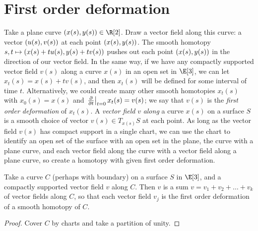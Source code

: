 \section{First order deformation}
Take a plane curve \(\pr{x(s),y(s)}\in\R[2]\).
Draw a vector field along this curve: a vector \(\left(u(s),v(s)\right)\) at each point \(\left(x(s),y(s)\right)\).
The smooth homotopy \(s,t \mapsto \left(x(s)+tu(s),y(s)+tv(s)\right)\) pushes out each point \(\left(x(s),y(s)\right)\) in the direction of our vector field.
In the same way, if we have any compactly supported vector field \(v(s)\) along a curve \(x(s)\) in an open set in \(\E[3]\), we can let \(x_t(s)=x(s)+tv(s)\), and then \(x_t(s)\) will be defined for some interval of time \(t\). 
Alternatively, we could create many other smooth homotopies \(x_t(s)\) with \(x_0(s)=x(s)\) and \(\left.\pderiv{}{t}\right|_{t=0} x_t(s)=v(s)\); we say that \(v(s)\) is the \emph{first order deformation} of \(x_t(s)\).
A \emph{vector field} \(v\) \emph{along} a curve \(x(s)\) on a surface \(S\) is a smooth choice of vector \(v(s) \in T_{x(s)} S\) at each point.
As long as the vector field \(v(s)\) has compact support in a single chart, we can use the chart to identify an open set of the surface with an open set in the plane, the curve with a plane curve, and each vector field along the curve with a vector field along a plane curve, so create a homotopy with given first order deformation.
\begin{lemma}
Take a curve \(C\) (perhaps with boundary) on a surface \(S\) in \(\E[3]\), and a compactly supported vector field \(v\) along \(C\).
Then \(v\) is a sum \(v=v_1+v_2+\dots+v_k\) of vector fields along \(C\), so that each vector field \(v_j\) is the first order deformation of a smooth homotopy of \(C\).
\end{lemma}
\begin{proof}
Cover \(C\) by charts and take a partition of unity.
\end{proof}

